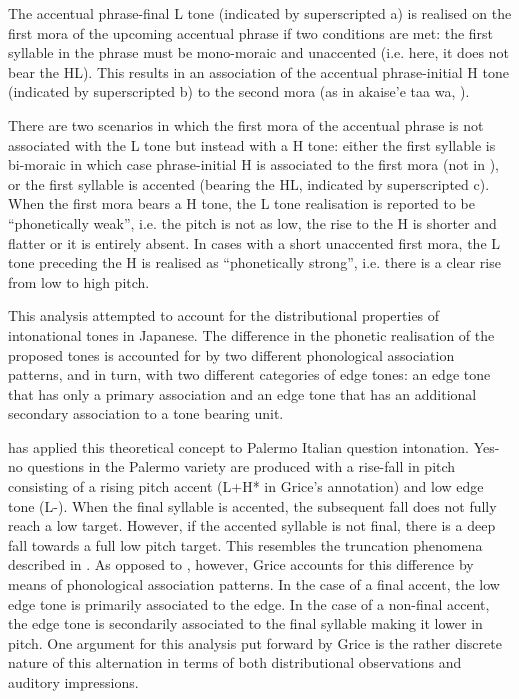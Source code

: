 \newpage  
The accentual phrase-final L tone (indicated by superscripted a) is realised on the first mora of the upcoming accentual phrase if two conditions are met: the first syllable in the phrase must be mono-moraic and unaccented (i.e. here, it does not bear the HL). This results in an association of the accentual phrase-initial H tone (indicated by superscripted b) to the second mora (as in akaise’e taa wa, ).

There are two scenarios in which the first mora of the accentual phrase is not associated with the L tone but instead with a H tone: either the first syllable is bi-moraic in which case phrase-initial H is associated to the first mora (not in ), or the first syllable is accented (bearing the HL, indicated by superscripted c). When the first mora bears a H tone, the L tone realisation is reported to be “phonetically weak”, i.e. the pitch is not as low, the rise to the H is shorter and flatter or it is entirely absent. In cases with a short unaccented first mora, the L tone preceding the H is realised as “phonetically strong”, i.e. there is a clear rise from low to high pitch. 

\newpage 
This analysis attempted to account for the distributional properties of intonational tones in Japanese. The difference in the phonetic realisation of the proposed tones is accounted for by two different phonological association patterns, and in turn, with two different categories of edge tones: an edge tone that has only a primary association and an edge tone that has an additional secondary association to a tone bearing unit.

\citet{Grice1995} has applied this theoretical concept to Palermo Italian question intonation. Yes-no questions in the Palermo variety are produced with a rise-fall in pitch consisting of a rising pitch accent (L+H* in Grice’s annotation) and low edge tone (L-). When the final syllable is accented, the subsequent fall does not fully reach a low target. However, if the accented syllable is not final, there is a deep fall towards a full low pitch target. This resembles the truncation phenomena described in . As opposed to \citet{Grabe1998}, however, Grice accounts for this difference by means of phonological association patterns. In the case of a final accent, the low edge tone is primarily associated to the edge. In the case of a non-final accent, the edge tone is secondarily associated to the final syllable making it lower in pitch. One argument for this analysis put forward by Grice is the rather discrete nature of this alternation in terms of both distributional observations and auditory impressions.

